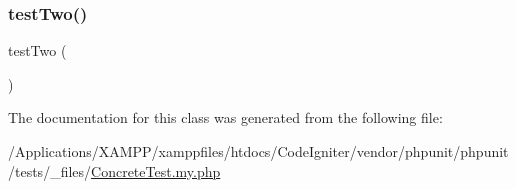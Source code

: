 \subsubsection{\texorpdfstring{test\+Two()}{testTwo()}}
{\footnotesize\ttfamily test\+Two (\begin{DoxyParamCaption}{ }\end{DoxyParamCaption})}



The documentation for this class was generated from the following file\+:\begin{DoxyCompactItemize}
\item 
/\+Applications/\+X\+A\+M\+P\+P/xamppfiles/htdocs/\+Code\+Igniter/vendor/phpunit/phpunit/tests/\+\_\+files/\mbox{\hyperlink{_concrete_test_8my_8php}{Concrete\+Test.\+my.\+php}}\end{DoxyCompactItemize}
